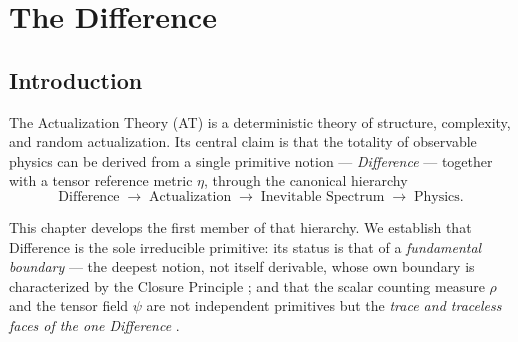%
%


\chapter{The Difference}
\label{c01:chap:difference}

\section{Introduction}
\label{c01:sec:difference-introduction}

The Actualization Theory (AT) is a deterministic theory of structure, complexity, and random
actualization. Its central claim is that the totality of observable physics can be derived
from a single primitive notion --- \emph{Difference} --- together with a tensor reference
metric $\eta$, through the canonical hierarchy
\begin{equation}
\label{c01:eq:canonical-core}
\text{Difference}\;\longrightarrow\;\text{Actualization}\;\longrightarrow\;\text{Inevitable Spectrum}\;\longrightarrow\;\text{Physics}.
\end{equation}

This chapter develops the first member of that hierarchy. We establish that Difference is
the sole irreducible primitive: its status is that of a \emph{fundamental boundary} --- the
deepest notion, not itself derivable, whose own boundary is characterized by
the Closure Principle \cite{c01:QG278,c01:QG282}; and that the scalar counting measure
$\rho$ and the tensor field $\psi$ are not independent primitives but the \emph{trace and
traceless faces of the one Difference} \cite{c01:QG286,c01:QG301}.

